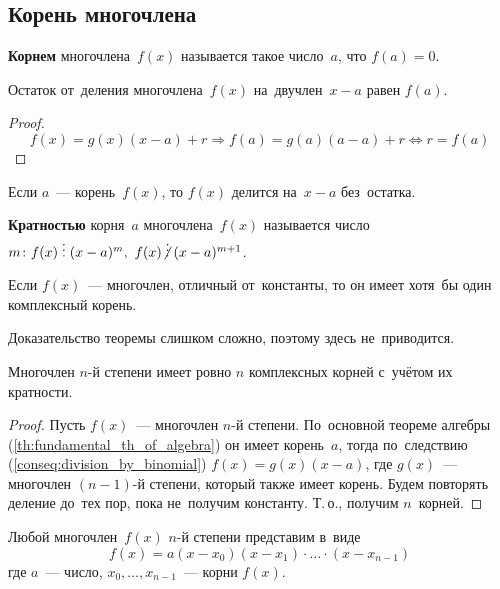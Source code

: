 \subsection{Корень многочлена}
\textbf{Корнем} многочлена~$f(x)$ называется такое число~$a$, что $f(a) = 0$.

\begin{theorem}[Безу]
Остаток от~деления многочлена~$f(x)$ на~двучлен~$x - a$ равен $f(a)$.
\end{theorem}
\begin{proof}
\begin{equation*}
f(x) = g(x)(x - a) + r \Rightarrow f(a) = g(a)(a - a) + r \Leftrightarrow r = f(a)
\end{equation*}
\end{proof}

\begin{consequent}
\label{conseq:division_by_binomial}
Если $a$~--- корень~$f(x)$, то $f(x)$ делится на~$x - a$ без~остатка.
\end{consequent}

\textbf{Кратностью} корня~$a$ многочлена~$f(x)$ называется число~
$m \colon f(x) \mult (x - a)^m, \ f(x) \notmult (x - a)^{m+1}$.

\begin{theorem}
\label{th:fundamental_th_of_algebra}
Если $f(x)$~--- многочлен, отличный от~константы, то он имеет хотя~бы один комплексный корень.
\end{theorem}%
Доказательство теоремы слишком сложно, поэтому здесь не~приводится.

\begin{consequent}
\label{conseq:n_roots_of_polynomial}
Многочлен $n$\nobreakdash-й степени имеет ровно $n$ комплексных корней с~учётом их кратности.
\end{consequent}
\begin{proof}
Пусть $f(x)$~--- многочлен $n$\nobreakdash-й степени.
По~основной теореме алгебры (\ref{th:fundamental_th_of_algebra}) он имеет корень~$a$, тогда по~следствию (\ref{conseq:division_by_binomial}) $f(x) = g(x)(x - a)$, где $g(x)$~--- многочлен $(n - 1)$\nobreakdash-й степени, который также имеет корень.
Будем повторять деление до~тех пор, пока не~получим константу.
Т.\,о., получим $n$~корней.
\end{proof}

\begin{consequent}
Любой многочлен~$f(x)$ $n$\nobreakdash-й степени представим в~виде
\begin{equation*}
f(x) = a(x - x_0)(x - x_1) \cdot \ldots \cdot (x - x_{n-1})
\end{equation*}
где $a$~--- число, $x_0, \ldots, x_{n-1}$~--- корни $f(x)$.
\end{consequent}

